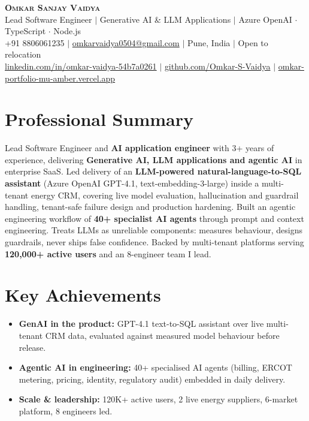 \documentclass[letterpaper,11pt]{article}
\newcommand{\resumeItem}[1]{\item\small{{#1 \vspace{-2pt}}}}
\newcommand{\resumeSubItem}[1]{\resumeItem{#1}\vspace{-2pt}}
\newcommand{\resumeSubHeadingListStart}{\begin{itemize}[leftmargin=0.15in, label={}]}
\newcommand{\resumeSubHeadingListEnd}{\end{itemize}}
\begin{document}
\begin{center}
\textbf{\Huge \scshape Omkar Sanjay Vaidya} \\ \vspace{2pt}
\large Lead Software Engineer $|$ Generative AI \& LLM Applications $|$ Azure OpenAI $\cdot$ TypeScript $\cdot$ Node.js \\ \vspace{2pt}
\small +91 8806061235 $|$
\href{mailto:omkarvaidya0504@gmail.com}{omkarvaidya0504@gmail.com} $|$
Pune, India $|$ Open to relocation \\
\href{https://www.linkedin.com/in/omkar-vaidya-54b7a0261/}{linkedin.com/in/omkar-vaidya-54b7a0261} $|$
\href{https://github.com/Omkar-S-Vaidya}{github.com/Omkar-S-Vaidya} $|$
\href{https://omkar-portfolio-mu-amber.vercel.app/}{omkar-portfolio-mu-amber.vercel.app}
\end{center}

\section{Professional Summary}
\small{Lead Software Engineer and \textbf{AI application engineer} with 3+ years of experience, delivering \textbf{Generative AI, LLM applications and agentic AI} in enterprise SaaS. Led delivery of an \textbf{LLM-powered natural-language-to-SQL assistant} (Azure OpenAI GPT-4.1, text-embedding-3-large) inside a multi-tenant energy CRM, covering live model evaluation, hallucination and guardrail handling, tenant-safe failure design and production hardening. Built an agentic engineering workflow of \textbf{40+ specialist AI agents} through prompt and context engineering. Treats LLMs as unreliable components: measures behaviour, designs guardrails, never ships false confidence. Backed by multi-tenant platforms serving \textbf{120,000+ active users} and an 8-engineer team I lead.}

\section{Key Achievements}
\resumeSubHeadingListStart
\resumeSubItem{\textbf{GenAI in the product:} GPT-4.1 text-to-SQL assistant over live multi-tenant CRM data, evaluated against measured model behaviour before release.}
\resumeSubItem{\textbf{Agentic AI in engineering:} 40+ specialised AI agents (billing, ERCOT metering, pricing, identity, regulatory audit) embedded in daily delivery.}
\resumeSubItem{\textbf{Scale \& leadership:} 120K+ active users, 2 live energy suppliers, 6-market platform, 8 engineers led.}
\resumeSubHeadingListEnd
\end{document}
